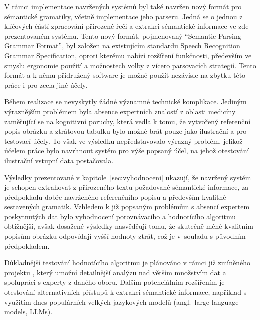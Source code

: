 V rámci implementace navržených systémů byl také navržen nový formát pro sémantické gramatiky, včetně implementace jeho parseru.
Jedná se o jednou z klíčových částí zpracování přirozené řeči a extrakci sémantické informace ve zde prezentovaném systému.
Tento nový formát, pojmenovaný \enquote{Semantic Parsing Grammar Format}, byl založen na existujícím standardu Speech Recognition Grammar Specification,
oproti kterému nabízí rozšíření funkčnosti, především ve smyslu ergonomie použití a možnostech volby z vícero parsovacích strategií.
Tento formát a k němu přidružený software je možné použít nezávisle na zbytku této práce i pro zcela jiné účely.

Během realizace se nevyskytly žádné významné technické komplikace.
Jediným výraznějším problémem byla absence expertních znalostí z oblasti medicíny zaměřující se na kognitivní poruchy,
která vedla k tomu, že vytvořený referenční popis obrázku a ztrátovou tabulku bylo možné brát pouze jako ilustrační a pro testovací účely.
To však ve výsledku nepředstavovalo výrazný problém, jelikož účelem práce bylo navrhnout systém pro výše popsaný účel,
na jehož otestování ilustrační vstupní data postačovala.


Výsledky prezentované v kapitole~\ref{sec:vyhodnoceni} ukazují, že navržený systém je schopen extrahovat z přirozeného
textu požadované sémantické informace, za předpokladu dobře navrženého referenčního popisu a především kvalitně sestavených gramatik.
Vzhledem k již popsaným problémům s absencí expertem poskytnutých dat bylo vyhodnocení porovnávacího a hodnotícího algoritmu
obtížnější, avšak dosažené výsledky nasvědčují tomu, že skutečně méně kvalitním popisům obrázku odpovídají vyšší hodnoty
ztrát, což je v~souladu s původním předpokladem.

Důkladnější testování hodnotícího algoritmu je plánováno v rámci již zmíněného projektu \projekt{},
který umožní detailnější analýzu nad větším množstvím dat a spolupráci s experty z daného oboru.
Dalším potenciálním rozšířením je otestování alternativních přístupů k extrakci sémantické informace,
například s využitím dnes populárních velkých jazykových modelů (angl.~large language models, LLMs).


